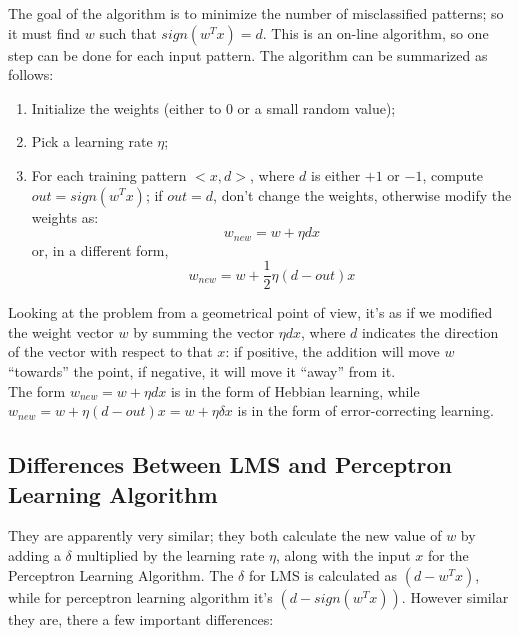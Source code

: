 The goal of the algorithm is to minimize the number of misclassified patterns; so it must find $w$ such that $sign(w^Tx)=d$. This is an on-line algorithm, so one step can be done for each input pattern. The algorithm can be summarized as follows:

\begin{enumerate}
    \item Initialize the weights (either to 0 or a small random value);

    \item Pick a learning rate $\eta$;

    \item For each training pattern $<x,d>$, where $d$ is either $+1$ or $-1$, compute $out = sign(w^Tx)$; if $out = d$, don't change the weights, otherwise modify the weights as:
    \begin{equation*}
        w_{new} = w + \eta d x
    \end{equation*}
    or, in a different form,
    \begin{equation*}
        w_{new} = w + \frac{1}{2} \eta (d-out) x
    \end{equation*}
\end{enumerate}

Looking at the problem from a geometrical point of view, it's as if we modified the weight vector $w$ by summing the vector $\eta d x$, where $d$ indicates the direction of the vector with respect to that $x$: if positive, the addition will move $w$ ``towards'' the point, if negative, it will move it ``away'' from it. \\
The form $w_{new} = w + \eta d x$ is in the form of Hebbian learning, while $w_{new} = w + \eta (d-out) x = w + \eta \delta x$ is in the form of error-correcting learning.

\subsection{Differences Between LMS and Perceptron Learning Algorithm}

They are apparently very similar; they both calculate the new value of $w$ by adding a $\delta$ multiplied by the learning rate $\eta$, along with the input $x$ for the Perceptron Learning Algorithm. The $\delta$ for LMS is calculated as $(d - w^Tx)$, while for perceptron learning algorithm it's $(d - sign(w^Tx))$. However similar they are, there a few important differences:

